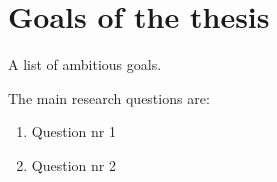 \chapter{Goals of the thesis}

A list of ambitious goals.

\lipsum[63]

The main research questions are:
\begin{enumerate}
	\item Question nr 1 
	\item Question nr 2
\end{enumerate}

\lipsum[66]